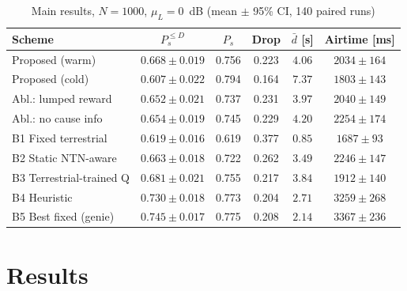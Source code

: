 \documentclass[conference]{IEEEtran}
\begin{document}
\begin{table}[t]
\caption{Main results, $N=1000$, $\mu_L=0$~dB (mean $\pm$ 95\% CI, 140 paired runs)}
\label{tab:main}
\centering
\setlength{\tabcolsep}{3pt}
\footnotesize
\begin{tabular}{lccccc}
\toprule
Scheme & $P_s^{\le D}$ & $P_s$ & Drop & $\bar d$ [s] & Airtime [ms]\\
\midrule
Proposed (warm) & $0.668{\pm}0.019$ & 0.756 & 0.223 & $4.06$ & $2034{\pm}164$\\
Proposed (cold) & $0.607{\pm}0.022$ & 0.794 & 0.164 & $7.37$ & $1803{\pm}143$\\
Abl.: lumped reward & $0.652{\pm}0.021$ & 0.737 & 0.231 & $3.97$ & $2040{\pm}149$\\
Abl.: no cause info & $0.654{\pm}0.019$ & 0.745 & 0.229 & $4.20$ & $2254{\pm}174$\\
B1 Fixed terrestrial & $0.619{\pm}0.016$ & 0.619 & 0.377 & $0.85$ & $1687{\pm}93$\\
B2 Static NTN-aware & $0.663{\pm}0.018$ & 0.722 & 0.262 & $3.49$ & $2246{\pm}147$\\
B3 Terrestrial-trained Q & $0.681{\pm}0.021$ & 0.755 & 0.217 & $3.84$ & $1912{\pm}140$\\
B4 Heuristic & $0.730{\pm}0.018$ & 0.773 & 0.204 & $2.71$ & $3259{\pm}268$\\
B5 Best fixed (genie) & $0.745{\pm}0.017$ & 0.775 & 0.208 & $2.14$ & $3367{\pm}236$\\
\bottomrule
\end{tabular}
\end{table}

\section{Results}
\end{document}
